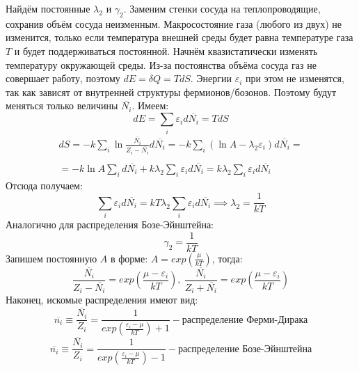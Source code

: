 \documentclass[A4]{article}
\begin{document}
    Найдём постоянные $\lambda_2$ и $\gamma_2$. Заменим стенки сосуда на теплопроводящие, сохранив
    объём сосуда неизменным. Макросостояние газа (любого из двух) не изменится, только если
    температура внешней среды будет равна температуре газа $T$ и будет поддерживаться постоянной.
    Начнём квазистатически изменять температуру окружающей среды. Из-за постоянства объёма сосуда
    газ не совершает работу, поэтому $dE = \delta Q = TdS$. Энергии $\varepsilon_i$ при этом не
    изменятся, так как зависят от внутренней структуры фермионов/бозонов. Поэтому будут меняться
    только величины $\overline{N_i}$. Имеем:
    \begin{equation*}
        dE = \sum\limits_{i} \varepsilon_id\overline{N_i} = TdS
    \end{equation*}
    \begin{equation*}
        \begin{split}
            dS = -k\sum\limits_{i} \ln{\frac{\overline{N_i}}{Z_i - \overline{N_i}}}d\overline{N_i} =
            -k\sum\limits_{i}(\ln{A} - \lambda_2\varepsilon_i)d\overline{N_i} = \\\\
            = -k\ln{A}\sum\limits_{i}d\overline{N_i} + k\lambda_2\sum\limits_{i}\varepsilon_id\overline{N_i} =
            k\lambda_2\sum\limits_{i}\varepsilon_id\overline{N_i}
        \end{split}
    \end{equation*}
    Отсюда получаем:
    \begin{equation*}
        \sum\limits_{i} \varepsilon_id\overline{N_i} = kT\lambda_2\sum\limits_{i}
        \varepsilon_id\overline{N_i} \implies \lambda_2 = \frac{1}{kT}
    \end{equation*}
    Аналогично для распределения Бозе-Эйнштейна:
    \begin{equation*}
        \gamma_2 = \frac{1}{kT}
    \end{equation*}
    Запишем постоянную $A$ в форме: $A = exp\left(\frac{\mu}{kT}\right)$, тогда:
    \begin{equation*}
        \frac{\overline{N_i}}{Z_i - \overline{N_i}} = exp\left(\frac{\mu - \varepsilon_i}{kT}\right),\
        \frac{\overline{N_i}}{Z_i + \overline{N_i}} = exp\left(\frac{\mu - \varepsilon_i}{kT}\right)
    \end{equation*}
    Наконец, искомые распределения имеют вид:
    \begin{equation}\label{FD_distribution}
        \overline{n_i} \equiv \frac{\overline{N_i}}{Z_i} =
        \frac{1}{exp\left(\frac{\varepsilon_i - \mu}{kT}\right) + 1} -
        \text{распределение Ферми-Дирака}
    \end{equation}
    \begin{equation}\label{BE_distribution}
        \overline{n_i} \equiv \frac{\overline{N_i}}{Z_i} =
        \frac{1}{exp\left(\frac{\varepsilon_i - \mu}{kT}\right) - 1} -
        \text{распределение Бозе-Эйнштейна}
    \end{equation}
\end{document}
